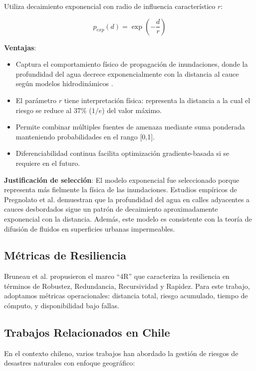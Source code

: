 \documentclass[conference]{IEEEtran}
\begin{document}
Utiliza decaimiento exponencial con radio de influencia característico $r$:

\begin{equation}
p_{exp}(d) = \exp\left(-\frac{d}{r}\right)
\end{equation}

\textbf{Ventajas}:
\begin{itemize}
    \item Captura el comportamiento físico de propagación de inundaciones, donde la profundidad del agua decrece exponencialmente con la distancia al cauce según modelos hidrodinámicos \citep{pregnolato2017}.
    \item El parámetro $r$ tiene interpretación física: representa la distancia a la cual el riesgo se reduce al 37\% ($1/e$) del valor máximo.
    \item Permite combinar múltiples fuentes de amenaza mediante suma ponderada manteniendo probabilidades en el rango [0,1].
    \item Diferenciabilidad continua facilita optimización gradiente-basada si se requiere en el futuro.
\end{itemize}

\textbf{Justificación de selección}: El modelo exponencial fue seleccionado porque representa más fielmente la física de las inundaciones. Estudios empíricos de Pregnolato et al. \citep{pregnolato2017} demuestran que la profundidad del agua en calles adyacentes a cauces desbordados sigue un patrón de decaimiento aproximadamente exponencial con la distancia. Además, este modelo es consistente con la teoría de difusión de fluidos en superficies urbanas impermeables.

\subsection{Métricas de Resiliencia}

Bruneau et al. \citep{bruneau2003} propusieron el marco ``4R'' que caracteriza la resiliencia en términos de Robustez, Redundancia, Recursividad y Rapidez. Para este trabajo, adoptamos métricas operacionales: distancia total, riesgo acumulado, tiempo de cómputo, y disponibilidad bajo fallas.

\subsection{Trabajos Relacionados en Chile}

En el contexto chileno, varios trabajos han abordado la gestión de riesgos de desastres naturales con enfoque geográfico:
\end{document}
